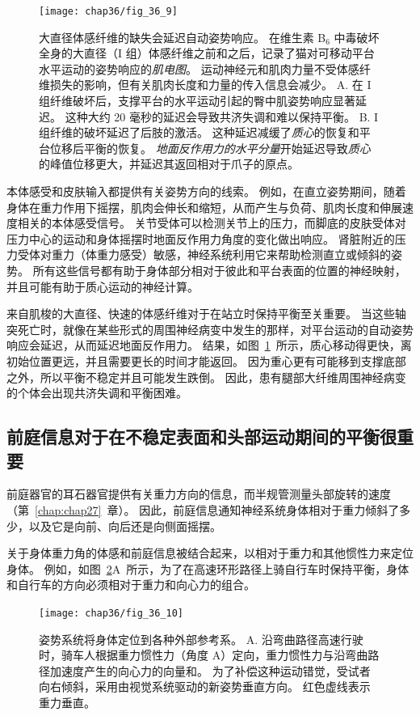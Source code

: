 \begin{figure}[htbp]
	\centering
	\texttt{[image: chap36/fig\_36\_9]}
	\caption{大直径体感纤维的缺失会延迟自动姿势响应。
		在维生素 B$_6$ 中毒破坏全身的大直径（I 组）体感纤维之前和之后，记录了猫对可移动平台水平运动的姿势响应的\textit{肌电图}。
		运动神经元和肌肉力量不受体感纤维损失的影响，但有关肌肉长度和力量的传入信息会减少。
		A. 在 I 组纤维破坏后，支撑平台的水平运动引起的臀中肌姿势响应显著延迟。
		这种大约 20 毫秒的延迟会导致共济失调和难以保持平衡。
		B. I 组纤维的破坏延迟了后肢的激活。
		这种延迟减缓了\textit{质心}的恢复和平台位移后平衡的恢复。
		\textit{地面反作用力的水平分量}开始延迟导致\textit{质心}的峰值位移更大，并延迟其返回相对于爪子的原点。}
	\label{fig:36_9}
\end{figure}


本体感受和皮肤输入都提供有关姿势方向的线索。
例如，在直立姿势期间，随着身体在重力作用下摇摆，肌肉会伸长和缩短，从而产生与负荷、肌肉长度和伸展速度相关的本体感受信号。
关节受体可以检测关节上的压力，而脚底的皮肤受体对压力中心的运动和身体摇摆时地面反作用力角度的变化做出响应。
肾脏附近的压力受体对重力（体重力感受）敏感，神经系统利用它来帮助检测直立或倾斜的姿势。
所有这些信号都有助于身体部分相对于彼此和平台表面的位置的神经映射，并且可能有助于质心运动的神经计算。


来自肌梭的大直径、快速的体感纤维对于在站立时保持平衡至关重要。
当这些轴突死亡时，就像在某些形式的周围神经病变中发生的那样，对平台运动的自动姿势响应会延迟，从而延迟地面反作用力。
结果，如图~\ref{fig:36_9}~所示，质心移动得更快，离初始位置更远，并且需要更长的时间才能返回。
因为重心更有可能移到支撑底部之外，所以平衡不稳定并且可能发生跌倒。
因此，患有腿部大纤维周围神经病变的个体会出现共济失调和平衡困难。



\subsection{前庭信息对于在不稳定表面和头部运动期间的平衡很重要}

前庭器官的耳石器官提供有关重力方向的信息，而半规管测量头部旋转的速度（第~\ref{chap:chap27}~章）。
因此，前庭信息通知神经系统身体相对于重力倾斜了多少，以及它是向前、向后还是向侧面摇摆。


关于身体重力角的体感和前庭信息被结合起来，以相对于重力和其他惯性力来定位身体。
例如，如图~\ref{fig:36_10}A~所示，为了在高速环形路径上骑自行车时保持平衡，身体和自行车的方向必须相对于重力和向心力的组合。


\begin{figure}[htbp]
	\centering
	\texttt{[image: chap36/fig\_36\_10]}
	\caption{姿势系统将身体定位到各种外部参考系。
		A. 沿弯曲路径高速行驶时，骑车人根据重力惯性力（角度 A）定向，重力惯性力与沿弯曲路径加速度产生的向心力的向量和。
		为了补偿这种运动错觉，受试者向右倾斜，采用由视觉系统驱动的新姿势垂直方向。
		红色虚线表示重力垂直。 }
	\label{fig:36_10}
\end{figure}


